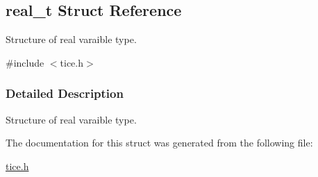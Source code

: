 \hypertarget{structreal__t}{}\subsection{real\+\_\+t Struct Reference}
\label{structreal__t}


Structure of real varaible type.  




{\ttfamily \#include $<$tice.\+h$>$}



\subsubsection{Detailed Description}
Structure of real varaible type. 

The documentation for this struct was generated from the following file\+:\begin{DoxyCompactItemize}
\item 
\hyperlink{tice_8h}{tice.\+h}\end{DoxyCompactItemize}
